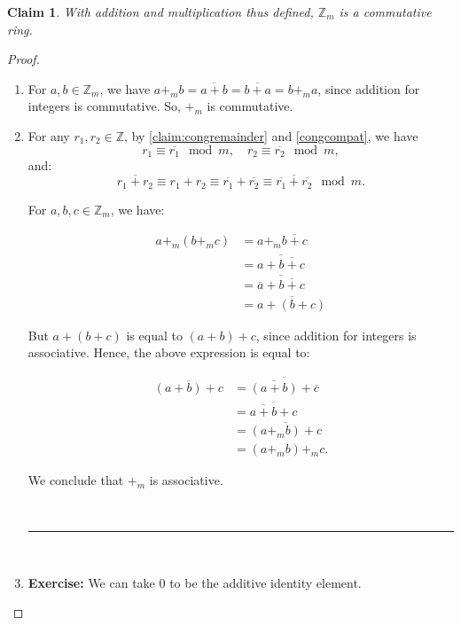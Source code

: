 \documentclass[a4paper,12pt]{report}
\newcommand{\class}[2]{#2}
\newcounter{statement}
\numberwithin{statement}{chapter}
\newtheorem{claim}[statement]{Claim}
\numberwithin{equation}{chapter}
\numberwithin{section}{chapter}
\numberwithin{subsection}{section}
\begin{document}
\begin{claim}
With addition and multiplication thus defined, $\mathbb{Z}_m$ is a commutative ring.
\end{claim}
\begin{proof}

\begin{enumerate}
\item 
For $a, b \in \mathbb{Z}_m$, we have $a +_m b = \overline{a + b} = \overline{b + a} = b +_m a$,
since addition for integers is commutative.  So, $+_m$ is commutative.

\item 
For any $r_1, r_2 \in \mathbb{Z}$,
by \cref{claim:congremainder} and \cref{congcompat},
we have
\[
r_1 \equiv \overline{r_1} \mod m, \quad r_2 \equiv \overline{r_2} \mod m,
\]
and:
\[
\overline{r_1 + r_2} \equiv r_1 + r_2 \equiv \overline{r_1} + \overline{r_2} \equiv \overline{\overline{r_1} + \overline{r_2}} \mod m.
\]


For $a, b, c \in \mathbb{Z}_m$, we have:

\[
\begin{split}
a +_m (b +_m c) &= a +_m \overline{b + c}
\\&
\class{steps7 steps}{= \overline{a + \overline{b + c}}}
\\&
\class{steps7 steps}{= \overline{\overline{a} + \overline{b + c}}}
\\&
\class{steps7 steps}{ = \overline{a + (b + c)}}
\end{split}
\]


But $a + (b + c)$ is equal to $(a + b) + c$, since addition for integers is associative.  Hence, the above expression
is equal to:

\[
\begin{split}
\overline{(a + b) + c} &= \overline{\overline{(a + b)} + \overline{c}}
\\&
\class{steps8 steps}{= \overline{\overline{a + b} + {c}}}
\\&
\class{steps8 steps}{ = \overline{(a +_m b) + c}}
\\&
\class{steps8 steps}{ = (a +_m b) +_m c.}
\end{split}
\]


We conclude that $+_m$ is associative.


\quad\\\hrule
\quad\\


\item 
 {\bf  Exercise:}  We can take 0 to be the additive identity element.


\end{enumerate}
\end{proof}
\end{document}
